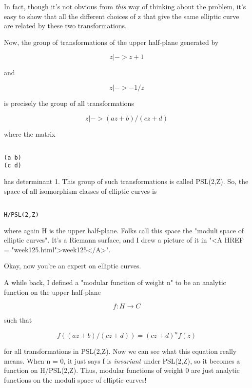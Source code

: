 In fact, though it's not obvious from \emph{this} way of thinking
about the problem, it's easy to show that all the different 
choices of z that give the same elliptic curve are related by 
these two transformations.

Now, the group of transformations of the upper half-plane 
generated by 


$$

z |-> z + 1
$$
    
and 


$$

z |-> -1/z
$$
    
is precisely the group of all transformations


$$

z |-> (az+b)/(cz+d)
$$
    
where the matrix 


\begin{verbatim}

(a b)
(c d)
\end{verbatim}
    
has determinant 1.  This group of such transformations is
called PSL(2,Z).  So, the space of all isomorphism classes 
of elliptic curves is


\begin{verbatim}

H/PSL(2,Z)
\end{verbatim}
    
where again H is the upper half-plane.  Folks call this
space the "moduli space of elliptic curves".  It's a Riemann 
surface, and I drew a picture of 
it in "<A HREF = "week125.html">week125</A>".

Okay, now you're an expert on elliptic curves.

A while back, I defined a "modular function of weight n" to be an 
analytic function on the upper half-plane


$$

f: H \to  C                  
$$
    
such that


$$

f((az+b)/(cz+d)) = (cz+d)^{n} f(z)
$$
    
for all transformations in PSL(2,Z).  Now we can see what
this equation really means.  When n = 0, it just says f is 
\emph{invariant} under PSL(2,Z), so it becomes a function on H/PSL(2,Z).
Thus, modular functions of weight 0 are just analytic functions 
on the moduli space of elliptic curves!  

